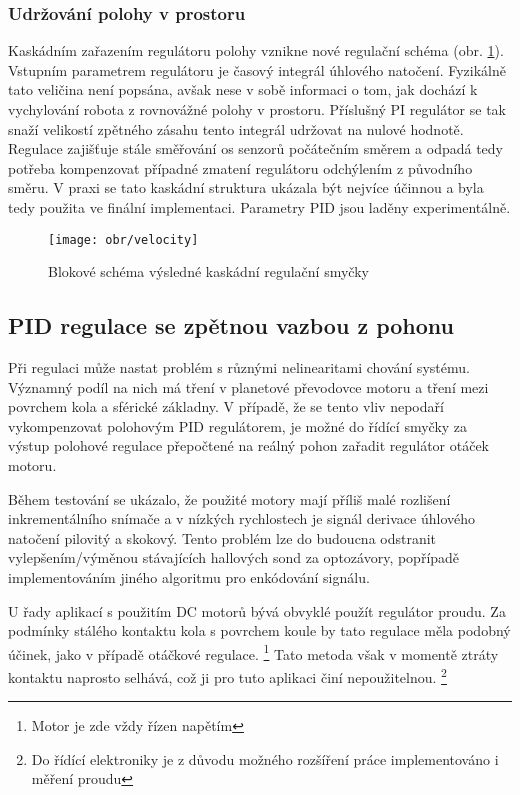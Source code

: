 \subsubsection*{Udržování polohy v prostoru}

Kaskádním zařazením regulátoru polohy vznikne nové regulační schéma (obr. \ref{kaskad}). Vstupním parametrem regulátoru je časový integrál úhlového natočení. Fyzikálně tato veličina není popsána, avšak nese v sobě informaci o tom, jak dochází k vychylování robota z rovnovážné polohy v prostoru. Příslušný PI regulátor se tak snaží velikostí zpětného zásahu tento integrál udržovat na nulové hodnotě. Regulace zajišťuje stále směřování os senzorů počátečním směrem a odpadá tedy potřeba kompenzovat případné zmatení regulátoru odchýlením z původního směru. V praxi se tato kaskádní struktura ukázala být nejvíce účinnou a byla tedy použita ve finální implementaci. Parametry PID jsou laděny experimentálně.
\begin{figure}[htb]
\begin{center}
\texttt{[image: obr/velocity]}
\end{center}
\caption{Blokové schéma výsledné kaskádní regulační smyčky}
\label{kaskad}
\end{figure}
\newpage

\subsection{PID regulace se zpětnou vazbou z pohonu}
\label{PID2}

Při regulaci může nastat problém s různými nelinearitami chování systému. Významný podíl na nich má tření v planetové převodovce motoru a tření mezi povrchem kola a sférické základny. V případě, že se tento vliv nepodaří vykompenzovat polohovým PID regulátorem, je možné do řídící smyčky za výstup polohové regulace přepočtené na reálný pohon zařadit regulátor otáček motoru. 

Během testování se ukázalo, že použité motory mají příliš malé rozlišení inkrementálního snímače a v nízkých rychlostech je signál derivace úhlového natočení pilovitý a skokový. Tento problém lze do budoucna odstranit vylepšením/výměnou stávajících hallových sond za optozávory, popřípadě implementováním jiného algoritmu pro enkódování signálu.	
	
U řady aplikací s použitím DC motorů bývá obvyklé použít regulátor proudu. Za podmínky stálého kontaktu kola s povrchem koule by tato regulace měla podobný účinek, jako v případě otáčkové regulace. \footnote{Motor je zde vždy řízen napětím} Tato metoda však v momentě ztráty kontaktu naprosto selhává, což ji pro tuto aplikaci činí nepoužitelnou. \footnote{Do řídící elektroniky je z důvodu možného rozšíření práce implementováno i měření proudu}

